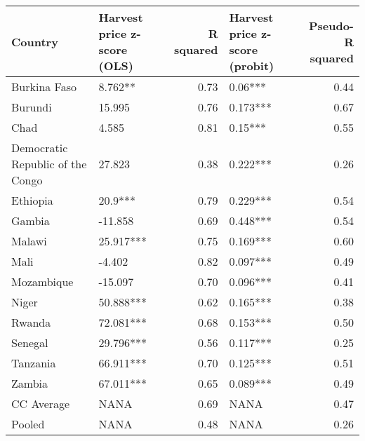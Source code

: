 \begin{table}[ht]
\centering
\begin{tabular}{llrlr}
  \hline
Country & Harvest price z-score (OLS) & R squared & Harvest price z-score (probit) & Pseudo-R squared \\ 
  \hline
Burkina Faso & 8.762**  & 0.73 & 0.06*** & 0.44 \\ 
  Burundi & 15.995  & 0.76 & 0.173*** & 0.67 \\ 
  Chad & 4.585  & 0.81 & 0.15*** & 0.55 \\ 
  Democratic Republic of the Congo & 27.823  & 0.38 & 0.222*** & 0.26 \\ 
  Ethiopia & 20.9*** & 0.79 & 0.229*** & 0.54 \\ 
  Gambia & -11.858  & 0.69 & 0.448*** & 0.54 \\ 
  Malawi & 25.917*** & 0.75 & 0.169*** & 0.60 \\ 
  Mali & -4.402  & 0.82 & 0.097*** & 0.49 \\ 
  Mozambique & -15.097  & 0.70 & 0.096*** & 0.41 \\ 
  Niger & 50.888*** & 0.62 & 0.165*** & 0.38 \\ 
  Rwanda & 72.081*** & 0.68 & 0.153*** & 0.50 \\ 
  Senegal & 29.796*** & 0.56 & 0.117*** & 0.25 \\ 
  Tanzania & 66.911*** & 0.70 & 0.125*** & 0.51 \\ 
  Zambia & 67.011*** & 0.65 & 0.089*** & 0.49 \\ 
  CC Average & NANA & 0.69 & NANA & 0.47 \\ 
  Pooled & NANA & 0.48 & NANA & 0.26 \\ 
   \hline
\end{tabular}
\end{table}
